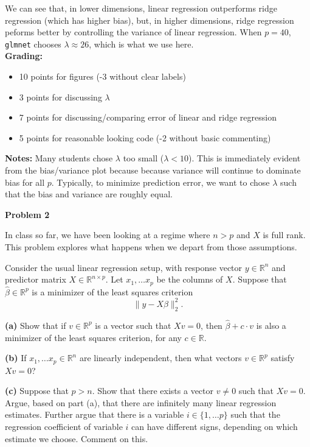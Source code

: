\documentclass[11pt]{article}
\newcommand{\R}{\mathbb{R}}
\def\hbeta{\hat{\beta}}
\begin{document}
\begin{framed}
We can see that, in lower dimensions, linear regression outperforms ridge
regression (which has higher bias), but, in higher dimensions, ridge regression
peforms better by controlling the variance of linear regression. When $p = 40$,
\texttt{glmnet} chooses $\lambda \approx 26$, which is what we use here. \\

{\bf Grading:}
\begin{itemize}
\item 10 points for figures (-3 without clear labels)
\item 3 points for discussing $\lambda$
\item 7 points for discussing/comparing error of linear and ridge regression
\item 5 points for reasonable looking code (-2 without basic commenting)
\end{itemize}

{\bf Notes:} Many students chose $\lambda$ too small ($\lambda < 10$). This is
immediately evident from the bias/variance plot because because variance will
continue to dominate bias for all $p$. Typically, to minimize prediction error,
we want to chose $\lambda$ such that the bias and variance are roughly equal.
\end{framed}


\bigskip
\bigskip
\noindent
{\bf\large Problem 2}

\smallskip
\noindent
In class so far, we have been looking at a regime where $n>p$ and $X$ is full
rank.  This problem explores what happens when we depart from those
assumptions.

Consider the usual linear regression setup, with response vector $y \in \R^n$ and
predictor matrix $X \in \R^{n\times p}$. Let $x_1,\ldots x_p$ be the columns
of $X$. Suppose that $\hbeta \in \R^p$ is a minimizer of the least squares 
criterion
\begin{equation*}
\|y-X\beta\|_2^2.
\end{equation*}

\bigskip
\noindent
{\bf (a)} Show that if $v \in \R^p$ is a vector such that $Xv=0$,
then $\hbeta + c\cdot v$ is also a minimizer of the least squares criterion,
for any $c \in \R$.

\bigskip
\noindent
{\bf (b)} If $x_1,\ldots x_p \in \R^n$ are linearly independent, then
what vectors $v \in \R^p$ satisfy $Xv=0$?

\bigskip
\noindent
{\bf (c)} Suppose that $p>n$. Show that there exists a vector $v\not=0$
such that $Xv=0$. Argue, based on part (a), that there are infinitely
many linear regression estimates. Further argue that there is a variable
$i \in \{1,\ldots p\}$ such that the regression coefficient of
variable $i$ can have different signs, depending on which estimate we 
choose. Comment on this. 
\end{document}
